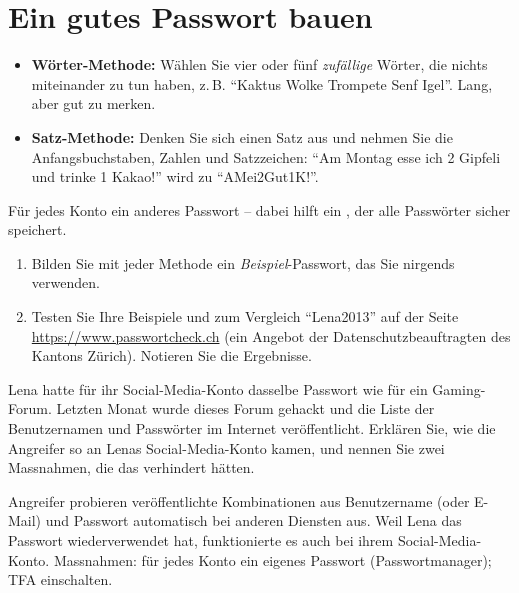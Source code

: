 \section{Ein gutes Passwort bauen}

\begin{myprocedure}
	\begin{itemize}
		\item \textbf{Wörter-Methode:} Wählen Sie vier oder fünf \emph{zufällige} Wörter, die nichts miteinander zu tun haben, z.\,B. \enquote{Kaktus Wolke Trompete Senf Igel}.
		      Lang, aber gut zu merken.
		\item \textbf{Satz-Methode:} Denken Sie sich einen Satz aus und nehmen Sie die Anfangsbuchstaben, Zahlen und Satzzeichen:
		      \enquote{Am Montag esse ich 2 Gipfeli und trinke 1 Kakao!} wird zu \enquote{AMei2Gut1K!}.
	\end{itemize}
	Für jedes Konto ein anderes Passwort -- dabei hilft ein , der alle Passwörter sicher speichert.
\end{myprocedure}

\begin{myexercise}
	\begin{enumerate}
		\item Bilden Sie mit jeder Methode ein \emph{Beispiel}-Passwort, das Sie nirgends verwenden.
		\item Testen Sie Ihre Beispiele und zum Vergleich \enquote{Lena2013} auf der Seite\\
		      \url{https://www.passwortcheck.ch} (ein Angebot der Daten\-schutz\-beauf\-trag\-ten des Kantons Zürich). Notieren Sie die Ergebnisse.
	\end{enumerate}
	\schreibzeile
	\schreibzeile
\end{myexercise}

\begin{myexercise}
	Lena hatte für ihr Social-Media-Konto dasselbe Passwort wie für ein Gaming-Forum.
	Letzten Monat wurde dieses Forum gehackt und die Liste der Benutzernamen und Passwörter im Internet veröffentlicht.
	Erklären Sie, wie die Angreifer so an Lenas Social-Media-Konto kamen, und nennen Sie zwei Massnahmen, die das verhindert hätten.
	\schreibzeile
	\schreibzeile
	\schreibzeile
	\begin{myanswer}
		Angreifer probieren veröffentlichte Kombinationen aus Benutzername (oder E-Mail) und Passwort automatisch bei anderen Diensten aus.
		Weil Lena das Passwort wiederverwendet hat, funktionierte es auch bei ihrem Social-Media-Konto.
		Massnahmen: für jedes Konto ein eigenes Passwort (Passwortmanager); \gls{TFA} einschalten.
	\end{myanswer}
\end{myexercise}

